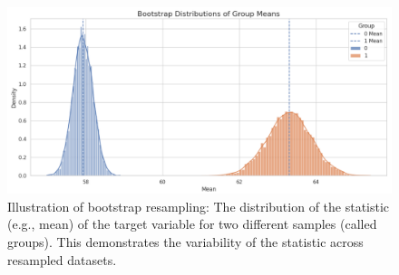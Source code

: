 \begin{center}
\begin{figure}[ht]
  \centering
  \includegraphics[width=5in]{img/bootstrap.jpg}
  \caption{Illustration of bootstrap resampling: The distribution of the
  statistic (e.g., mean) of the target variable for two different samples
(called groups). This demonstrates the variability of the statistic across
resampled datasets.}
  \label{Figure:fig_beh}
\end{figure}
\end{center}
